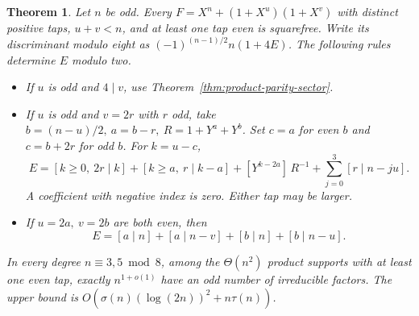 \documentclass[11pt]{article}
\newtheorem{theorem}{Theorem}
\begin{document}
\begin{theorem}\label{thm:all-even-taps}
Let \(n\) be odd. Every \(F=X^n+(1+X^u)(1+X^v)\) with distinct
positive taps, \(u+v<n\), and at least one tap even is squarefree.
Write its discriminant modulo eight as \((-1)^{(n-1)/2}n(1+4E)\).
The following rules determine \(E\) modulo two.
\begin{itemize}
\item If \(u\) is odd and \(4\mid v\), use
Theorem~\ref{thm:product-parity-sector}.
\item If \(u\) is odd and \(v=2r\) with \(r\) odd, take
\(b=(n-u)/2,\ a=b-r,\ R=1+Y^a+Y^b\). Set \(c=a\) for even \(b\)
and \(c=b+2r\) for odd \(b\). For \(k=u-c\),
\[
 E=[k\ge0,\ 2r\mid k]+[k\ge a,\ r\mid k-a]
      +[Y^{k-2a}]\,R^{-1}+\sum_{j=0}^3[r\mid n-ju].
\]
A coefficient with negative index is zero. Either tap may be larger.
\item If \(u=2a,\ v=2b\) are both even, then
\[
 E=[a\mid n]+[a\mid n-v]+[b\mid n]+[b\mid n-u].
\]
\end{itemize}
In every degree \(n\equiv3,5\bmod8\), among the
\(\Theta(n^2)\) product supports with at least one even tap, exactly
\(n^{1+o(1)}\) have an odd number of irreducible factors. The upper
bound is \(O(\sigma(n)(\log(2n))^2+n\tau(n))\).
\end{theorem}
\end{document}

